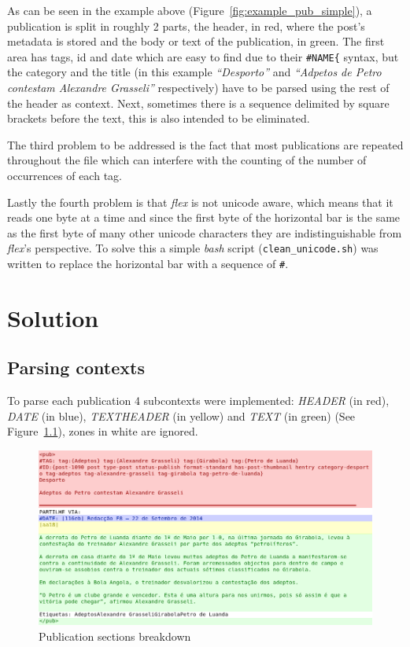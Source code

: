 \documentclass[a4paper]{report}
\begin{document}
As can be seen in the example above (Figure~\ref{fig:example_pub_simple}), a
publication is split in roughly 2 parts, the header, in red, where the post's
metadata is stored and the body or text of the publication, in green. The first
area has tags, id and date which are easy to find due to their
\texttt{\#NAME\{} syntax, but the category and the title (in this example
\textit{``Desporto''} and \textit{``Adpetos de Petro contestam Alexandre
Grasseli''} respectively) have to be parsed using the rest of the header as
context. Next, sometimes there is a sequence delimited by square brackets before
the text, this is also intended to be eliminated.

The third problem to be addressed is the fact that most publications
are repeated throughout the file which can interfere with the counting of the
number of occurrences of each tag.

Lastly the fourth problem is that \textit{flex} is not unicode aware,
which means that it reads one byte at a time and since the first byte of the
horizontal bar is the same as the first byte of many other unicode characters
they are indistinguishable from \textit{flex}'s perspective. To solve this a
simple \textit{bash} script (\texttt{clean\_unicode.sh}) was written to replace
the horizontal bar with a sequence of \verb!#!.

\chapter{Solution}

\section{Parsing contexts}

To parse each publication 4 subcontexts were implemented: \textit{HEADER} (in
red), \textit{DATE} (in blue), \textit{TEXTHEADER} (in yellow) and
\textit{TEXT} (in green) (See Figure~\ref{fig:example_pub_colored}), zones in
white are ignored.

\begin{figure}[h]
    \includegraphics[width=\textwidth]{./example_pub_colored.png}
    \caption{Publication sections breakdown}\label{fig:example_pub_colored}
\end{figure}
\end{document}
